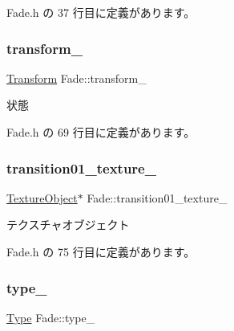  Fade.\+h の 37 行目に定義があります。

\mbox{\label{class_fade_a3b94f7f5317c98e1db1cc17346313626}} 
\subsubsection{\texorpdfstring{transform\+\_\+}{transform\_}}
{\footnotesize\ttfamily \mbox{\hyperlink{class_transform}{Transform}} Fade\+::transform\+\_\+\hspace{0.3cm}{\ttfamily [private]}}



状態 



 Fade.\+h の 69 行目に定義があります。

\mbox{\label{class_fade_a4ff29d821f15a33e2110acc03c8d8a84}} 
\subsubsection{\texorpdfstring{transition01\+\_\+texture\+\_\+}{transition01\_texture\_}}
{\footnotesize\ttfamily \mbox{\hyperlink{class_texture_object}{Texture\+Object}}$\ast$ Fade\+::transition01\+\_\+texture\+\_\+\hspace{0.3cm}{\ttfamily [private]}}



テクスチャオブジェクト 



 Fade.\+h の 75 行目に定義があります。

\mbox{\label{class_fade_a1d04a65762c863a1d3571f0e1d47532a}} 
\subsubsection{\texorpdfstring{type\+\_\+}{type\_}}
{\footnotesize\ttfamily \mbox{\hyperlink{class_fade_ac06f27215b454aa05b93c236476d6e80}{Type}} Fade\+::type\+\_\+\hspace{0.3cm}{\ttfamily [private]}}



